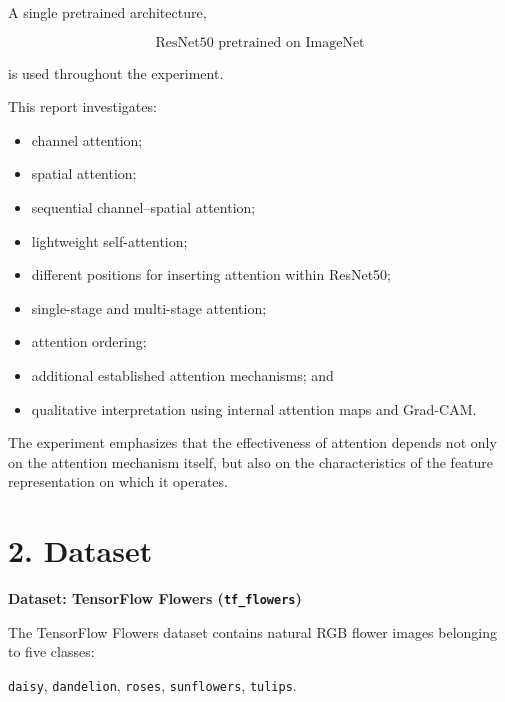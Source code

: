 \documentclass[10pt]{article}
\begin{document}
A single pretrained architecture,

\[
\boxed{\text{ResNet50 pretrained on ImageNet}}
\]

is used throughout the experiment.

This report investigates:

\begin{itemize}

\item channel attention;

\item spatial attention;

\item sequential channel--spatial attention;

\item lightweight self-attention;

\item different positions for inserting attention within ResNet50;

\item single-stage and multi-stage attention;

\item attention ordering;

\item additional established attention mechanisms; and

\item qualitative interpretation using internal attention maps and Grad-CAM.

\end{itemize}

The experiment emphasizes that the effectiveness of attention depends not
only on the attention mechanism itself, but also on the characteristics of
the feature representation on which it operates.
\section*{2. Dataset}

\textbf{Dataset: TensorFlow Flowers (\texttt{tf\_flowers})}

The TensorFlow Flowers dataset contains natural RGB flower images belonging
to five classes:

\begin{center}
\texttt{daisy},
\quad
\texttt{dandelion},
\quad
\texttt{roses},
\quad
\texttt{sunflowers},
\quad
\texttt{tulips}.
\end{center}
\end{document}
